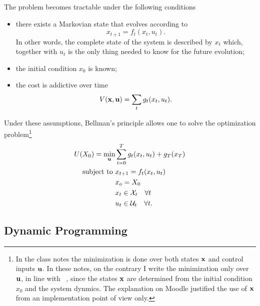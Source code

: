 The problem becomes tractable under the following conditions
\begin{itemize}
\item there exists a Markovian state that evolves according to
  \begin{equation*}
    x_{t+1} = f_t(x_t,u_t).
  \end{equation*}
  In other words, the complete state of the system is described by $x_t$ which, together with $u_t$ is the only thing needed to know for the future evolution;
\item the initial condition $x_0$ is known;
\item the cost is addictive over time
  \begin{equation*}
    V(\boldsymbol{\mathrm{x}},\boldsymbol{\mathrm{u}}) = \sum_t g_t(x_t,u_t).
  \end{equation*}
\end{itemize}
Under these assumptions, Bellman's principle allows one to solve the optimization problem\footnote{In the class notes the minimization is done over both states $\boldsymbol{\mathrm{x}}$ and control inputs $\boldsymbol{\mathrm{u}}$. In these notes, on the contrary I write the minimization only over $\boldsymbol{\mathrm{u}}$, in line with ~\cite{}, since the states $\boldsymbol{\mathrm{x}}$ are determined from the initial condition $x_0$ and the system dynmics. The explanation on Moodle justified the use of $\boldsymbol{\mathrm{x}}$ from an implementation point of view only.}
\begin{equation}
  \label{eq:general-optimization-problem}
  \begin{aligned}
    U(X_0) = \min_{\boldsymbol{\mathrm{u}}} & \sum_{t=0}^T g_t(x_t,u_t) + g_T(x_T) \\
    \text{subject to } & x_{t+1} = f_t(x_t,u_t)\\
                              & x_o=X_0 \\
                              &x_t \in \mathcal{X}_t\quad \forall t \\
                              &u_t \in \mathcal{U}_t\quad \forall t.
  \end{aligned}
\end{equation}

\subsection{Dynamic Programming}
\label{sec:dynamic-programming}

